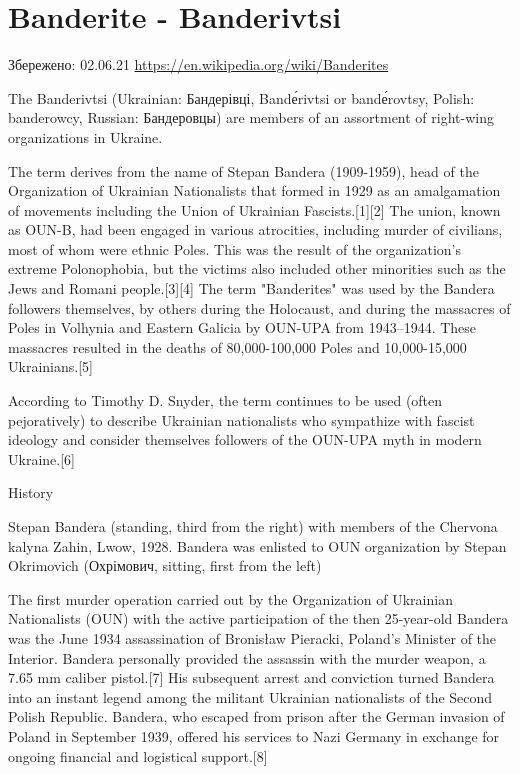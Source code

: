  
 
 
 
 
\section{Banderite - Banderivtsi}
\label{sec:wikipedia.en.banderite}

Збережено: 02.06.21
\url{https://en.wikipedia.org/wiki/Banderites}

The Banderivtsi (Ukrainian: Бандерівці, Bandе́rivtsi or bandе́rovtsy, Polish:
banderowcy, Russian: Бандеровцы) are members of an assortment of right-wing
organizations in Ukraine.

The term derives from the name of Stepan Bandera (1909-1959), head of the
Organization of Ukrainian Nationalists that formed in 1929 as an amalgamation
of movements including the Union of Ukrainian Fascists.[1][2] The union, known
as OUN-B, had been engaged in various atrocities, including murder of
civilians, most of whom were ethnic Poles. This was the result of the
organization's extreme Polonophobia, but the victims also included other
minorities such as the Jews and Romani people.[3][4] The term "Banderites" was
used by the Bandera followers themselves, by others during the Holocaust, and
during the massacres of Poles in Volhynia and Eastern Galicia by OUN-UPA from
1943–1944. These massacres resulted in the deaths of 80,000-100,000 Poles and
10,000-15,000 Ukrainians.[5]

According to Timothy D. Snyder, the term continues to be used (often
pejoratively) to describe Ukrainian nationalists who sympathize with fascist
ideology and consider themselves followers of the OUN-UPA myth in modern
Ukraine.[6] 

History

Stepan Bandera (standing, third from the right) with members of the Chervona
kalyna Zahin, Lwow, 1928. Bandera was enlisted to OUN organization by Stepan
Okrimovich (Охрімович, sitting, first from the left)

The first murder operation carried out by the Organization of Ukrainian
Nationalists (OUN) with the active participation of the then 25-year-old
Bandera was the June 1934 assassination of Bronisław Pieracki, Poland's
Minister of the Interior. Bandera personally provided the assassin with the
murder weapon, a 7.65 mm caliber pistol.[7] His subsequent arrest and
conviction turned Bandera into an instant legend among the militant Ukrainian
nationalists of the Second Polish Republic. Bandera, who escaped from prison
after the German invasion of Poland in September 1939, offered his services to
Nazi Germany in exchange for ongoing financial and logistical support.[8]

